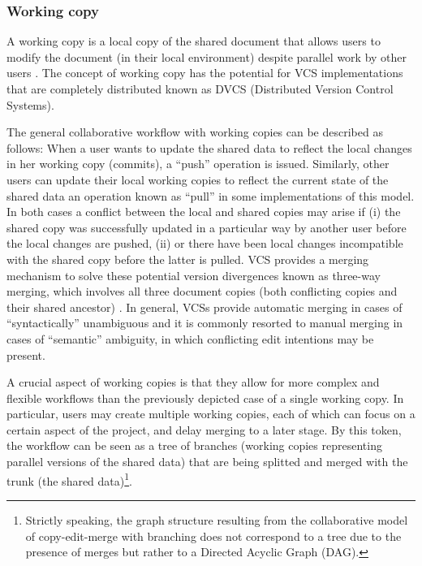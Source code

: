 \documentclass{sig-alternate}
\begin{document}
\subsubsection{Working copy}\label{subsec:workingcopy}
A working copy is a local copy of the shared document that allows users
to modify the document (in their local environment) despite parallel work by other users
\cite{Collins-Sussman}. The concept of working copy has the potential for VCS implementations
that are completely distributed \textemdash known as DVCS (Distributed Version Control Systems).

The general collaborative workflow with working copies can be described as follows:
When a user wants to update the shared data to reflect the local changes in her working copy
(commits), a ``push'' operation is issued. Similarly, other users can update their local
working copies to reflect the current state of the shared data \textemdash an operation
known as ``pull'' in some implementations of this model.
In both cases a conflict between the local and shared copies may arise if (i) the shared
copy was successfully updated in a particular way by another user before the local changes
are pushed, (ii) or there have been local changes incompatible with the shared copy before
the latter is pulled.
VCS provides a merging mechanism to solve these potential version divergences known as
three-way merging, which involves all three document copies (both conflicting copies and their
shared ancestor) \cite{Altmanninger2009}. In general, VCSs provide automatic merging in cases
of ``syntactically'' unambiguous and it is commonly resorted to manual merging in cases
of ``semantic'' ambiguity, in which conflicting edit intentions may be present.%

A crucial aspect of working copies is that they allow for more complex and flexible workflows
than the previously depicted case of a single working copy. In particular, users may create
multiple working copies, each of which can focus on a certain aspect of the project, and
delay merging to a later stage.
By this token, the workflow can be seen as a tree of branches (working copies
representing parallel versions of the shared data) that are being splitted and merged with
the trunk (the shared data)\footnote{
  Strictly speaking, the graph structure resulting from the collaborative model of copy-edit-merge
  with branching does not correspond to a tree due to the presence of merges but rather to a
  Directed Acyclic Graph (DAG).
}.
\end{document}
